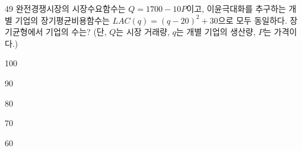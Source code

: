 \begin{question}{49}
완전경쟁시장의 시장수요함수는 $Q=1700-10P$이고, 이윤극대화를 추구하는 개별 기업의 장기평균비용함수는 $LAC(q)=(q-20)^{2}+30$으로 모두 동일하다. 장기균형에서 기업의 수는? (단, $Q$는 시장 거래량, $q$는 개별 기업의 생산량, $P$는 가격이다.)
\begin{choices}
  \item 100
  \item 90
  \item 80
  \item 70
  \item 60
\end{choices}
\end{question}
